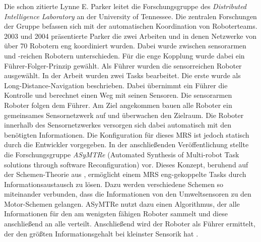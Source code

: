 Die schon zitierte Lynne E. Parker leitet die Forschungsgruppe des \textit{Distributed Intelligence Laboratory} an der University of Tennessee. Die zentralen Forschungen der Gruppe befassen sich mit der automatischen Koordination von Roboterteams. 2003 und 2004 präsentierte Parker die zwei Arbeiten \cite{parker2003effect} und \cite{parker2004tightly} in denen Netzwerke von über 70 Robotern eng koordiniert wurden. Dabei wurde zwischen sensorarmen und -reichen Robotern unterschieden. Für die enge Kopplung wurde dabei ein Führer-Folger-Prinzip gewählt. Als Führer wurden die sensorreichen Roboter ausgewählt. In der Arbeit wurden zwei Tasks bearbeitet. Die erste wurde als Long-Distance-Navigation beschrieben. Dabei übernimmt ein Führer die Kontrolle und berechnet einen Weg mit seinen Sensoren. Die sensorarmen Roboter folgen dem Führer. Am Ziel angekommen bauen alle Roboter ein gemeinsames Sensornetzwerk auf und überwachen den Zielraum. Die Roboter innerhalb des Sensornetzwerkes versorgen sich dabei automatisch mit den benötigten Informationen. Die Konfiguration für dieses MRS ist jedoch statisch durch die Entwickler vorgegeben. In der anschließenden Veröffentlichung \cite{parker2005enabling} stellte die Forschungsgruppe \textit{ASyMTRe} (Automated Synthesis of Multi-robot Task solutions through software Reconfiguration) vor. Dieses Konzept, beruhend auf der Schemen-Theorie aus \cite{arkin1987motor}, ermöglicht einem MRS eng-gekoppelte Tasks durch Informationsaustausch zu lösen. Dazu werden verschiedene Schemen so miteinander verbunden, dass die Informationen von den Umweltsensoren zu den Motor-Schemen gelangen. ASyMTRe nutzt dazu einen Algorithmus, der alle Informationen für den am wenigsten fähigen Roboter sammelt und diese anschließend an alle verteilt. Anschließend wird der Roboter als Führer ermittelt, der den größten Informationsgehalt bei kleinster Sensorik hat \citep{lundh2006plan} .


